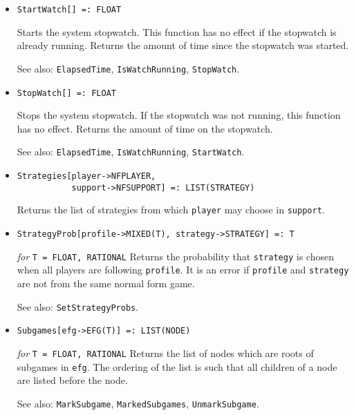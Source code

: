 \begin{itemize}
\item
\protect \large \begin{verbatim}
StartWatch[] =: FLOAT
\end{verbatim}\normalsize

\bd
Starts the system stopwatch.  This function has no
effect if the stopwatch is already running.
Returns the amount of time since the stopwatch was started.
\item [See also:] \verb+ElapsedTime+, \verb+IsWatchRunning+, \verb+StopWatch+.
\ed

\item
\protect \large \begin{verbatim}
StopWatch[] =: FLOAT
\end{verbatim}\normalsize

\bd
Stops the system stopwatch.  If the stopwatch was not
running, this function has no effect.  Returns the amount of time
on the stopwatch.
\item [See also:] \verb+ElapsedTime+, \verb+IsWatchRunning+,
\verb+StartWatch+.
\ed

\item
\protect \large \begin{verbatim}
Strategies[player->NFPLAYER, 
           support->NFSUPPORT] =: LIST(STRATEGY)
\end{verbatim}\normalsize

\bd
Returns the list of strategies from which  \verb+player+ may choose
in \verb+support+.
\ed

\item
\protect \large \begin{verbatim}
StrategyProb[profile->MIXED(T), strategy->STRATEGY] =: T
\end{verbatim} \normalsize

{\it for} {\tt T = FLOAT, RATIONAL}
\bd
Returns the probability that \verb+strategy+ is chosen when all
players are following \verb+profile+.  It is an error if \verb+profile+
and \verb+strategy+ are not from the same normal form game.
\item [See also:] \verb+SetStrategyProbs+.
\ed

\item
\protect \large \begin{verbatim}
Subgames[efg->EFG(T)] =: LIST(NODE)
\end{verbatim}\normalsize

{\it for} {\tt T = FLOAT, RATIONAL}
\bd
Returns the list of nodes which are roots of subgames in \verb+efg+.
The ordering of the list is such that
all children of a node are listed before the node.
\item [See also:] \verb+MarkSubgame+, \verb+MarkedSubgames+, 
\verb+UnmarkSubgame+.
\ed


\end{itemize}
